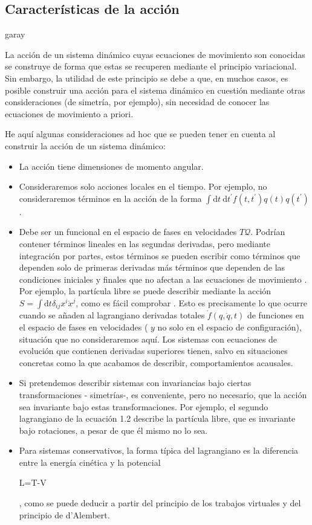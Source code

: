 \subsection{Características de la acción}
garay

La acción de un sistema dinámico cuyas ecuaciones de movimiento son conocidas se construye de forma que estas se recuperen mediante el principio variacional. Sin embargo, la utilidad de este principio se debe a que, en muchos casos, es posible construir una acción para el sistema dinámico en cuestión mediante otras consideraciones (de simetría, por ejemplo), sin necesidad de conocer las ecuaciones de movimiento a priori.

He aquí algunas consideraciones ad hoc que se pueden tener en cuenta al construir la acción de un sistema dinámico:
\begin{itemize}
  \item La acción tiene dimensiones de momento angular.
  \item Consideraremos solo acciones locales en el tiempo. Por ejemplo, no consideraremos términos en la acción de la forma $\int \mathrm{d} t \mathrm{~d} t^{\prime} f\left(t, t^{\prime}\right) q(t) q\left(t^{\prime}\right)$.
  \item Debe ser un funcional en el espacio de fases en velocidades $T \mathscr{Q}$. Podrían contener términos lineales en las segundas derivadas, pero mediante integración por partes, estos términos se pueden escribir como términos que dependen solo de primeras derivadas más términos que dependen de las condiciones iniciales y finales que no afectan a las ecuaciones de movimiento . Por ejemplo, la partícula libre se puede describir mediante la acción $S=\int \mathrm{d} t \delta_{i j} x^{i} \ddot{x}^{j}$, como es fácil comprobar . Esto es precisamente lo que ocurre cuando se añaden al lagrangiano derivadas totales $\dot{f}(q, \dot{q}, t)$ de funciones en el espacio de fases en velocidades ( $y$ no solo en el espacio de configuración), situación que no consideraremos aquí. Los sistemas con ecuaciones de evolución que contienen derivadas superiores tienen, salvo en situaciones concretas como la que acabamos de describir, comportamientos acausales.
  \item Si pretendemos describir sistemas con invariancias bajo ciertas transformaciones - simetrías-, es conveniente, pero no necesario, que la acción sea invariante bajo estas transformaciones. Por ejemplo, el segundo lagrangiano de la ecuación 1.2 describe la partícula libre, que es invariante bajo rotaciones, a pesar de que él mismo no lo sea.
  \item Para sistemas conservativos, la forma típica del lagrangiano es la diferencia entre la energía cinética y la potencial
  \begin{DispWithArrows}[format=c, displaystyle]
  L=T-V
  \end{DispWithArrows}
  , como se puede deducir a partir del principio de los trabajos virtuales y del principio de d'Alembert.
\end{itemize}


